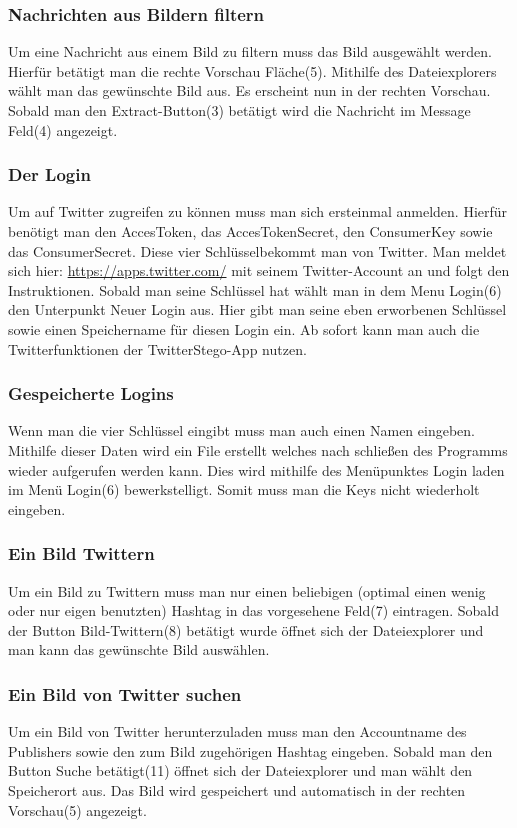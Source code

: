 \documentclass[11pt]{article}
\begin{document}
\newpage

\subsubsection{Nachrichten aus Bildern filtern}
Um eine Nachricht aus einem Bild zu filtern muss das Bild ausgewählt werden. Hierfür betätigt man die rechte Vorschau Fläche(5). Mithilfe des Dateiexplorers wählt man das gewünschte Bild aus. Es erscheint nun in der rechten Vorschau. Sobald man den Extract-Button(3) betätigt wird die Nachricht im Message Feld(4) angezeigt. 

\subsubsection{Der Login}
Um auf Twitter zugreifen zu können muss man sich ersteinmal anmelden. Hierfür benötigt man den AccesToken, das AccesTokenSecret, den ConsumerKey sowie das ConsumerSecret. Diese vier Schlüsselbekommt man von Twitter. Man meldet sich hier: \url{https://apps.twitter.com/} mit seinem Twitter-Account an und folgt den Instruktionen. Sobald man seine Schlüssel hat wählt man in dem Menu Login(6) den Unterpunkt Neuer Login aus. Hier gibt man seine eben erworbenen Schlüssel sowie einen Speichername für diesen Login ein.
Ab sofort kann man auch die Twitterfunktionen der TwitterStego-App nutzen.

\subsubsection{Gespeicherte Logins}
Wenn man die vier Schlüssel eingibt muss man auch einen Namen eingeben. Mithilfe dieser Daten wird ein File erstellt welches nach schließen des Programms wieder aufgerufen werden kann. Dies wird mithilfe des Menüpunktes Login laden im Menü Login(6) bewerkstelligt. Somit muss man die Keys nicht wiederholt eingeben.


\subsubsection{Ein Bild Twittern}
Um ein Bild zu Twittern muss man nur einen beliebigen (optimal einen wenig oder nur eigen benutzten) Hashtag in das vorgesehene Feld(7) eintragen. Sobald der Button Bild-Twittern(8) betätigt wurde öffnet sich der Dateiexplorer und man kann das gewünschte Bild auswählen. 

\subsubsection{Ein Bild von Twitter suchen}
Um ein Bild von Twitter herunterzuladen muss man den Accountname des Publishers sowie den zum Bild zugehörigen Hashtag eingeben. Sobald man den Button Suche betätigt(11) öffnet sich der Dateiexplorer und man wählt den Speicherort aus. Das Bild wird gespeichert und automatisch in der rechten Vorschau(5) angezeigt. 
\end{document}
